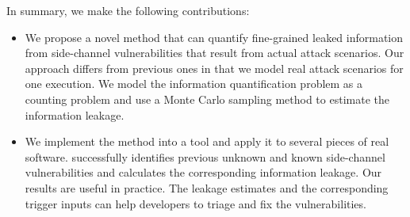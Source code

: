 
In summary, we make the following contributions:

\begin{itemize}
    \item We propose a novel method that can quantify fine-grained leaked
          information from side-channel vulnerabilities that result from actual attack
          scenarios. Our approach differs from previous ones in that we
          model real attack scenarios for one execution.
          We model the information quantification problem as a counting problem
          and use a Monte Carlo sampling method to estimate the information leakage.

    \item We implement the method into a tool and apply it
          to several pieces of real software. \tool{} successfully identifies
          previous unknown and known side-channel vulnerabilities and calculates the corresponding information leakage.
          Our results are useful in practice.
          The leakage estimates and the corresponding trigger inputs can
          help developers to triage and fix the vulnerabilities.
\end{itemize}

